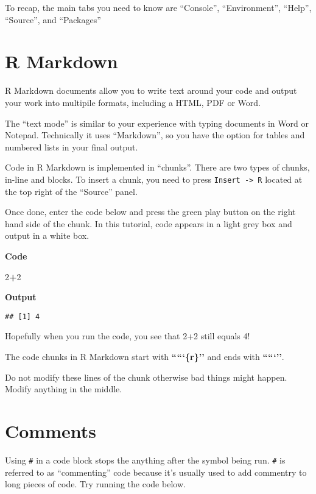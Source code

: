 \documentclass[]{book}
\newenvironment{Shaded}{\begin{snugshade}}{\end{snugshade}}
\newcommand{\DecValTok}[1]{\textcolor[rgb]{0.00,0.00,0.81}{#1}}
\newcommand{\OperatorTok}[1]{\textcolor[rgb]{0.81,0.36,0.00}{\textbf{#1}}}
\begin{document}
To recap, the main tabs you need to know are ``Console'', ``Environment'', ``Help'', ``Source'', and ``Packages''

\hypertarget{r-markdown}{%
\section{R Markdown}\label{r-markdown}}

R Markdown documents allow you to write text around your code and output your work into multipile formats, including a HTML, PDF or Word.

The ``text mode'' is similar to your experience with typing documents in Word or Notepad. Technically it uses ``Markdown'', so you have the option for tables and numbered lists in your final output.

Code in R Markdown is implemented in ``chunks''. There are two types of chunks, in-line and blocks. To insert a chunk, you need to press \texttt{Insert\ -\textgreater{}\ R} located at the top right of the ``Source'' panel.

Once done, enter the code below and press the green play button on the right hand side of the chunk. In this tutorial, code appears in a light grey box and output in a white box.

\textbf{Code}

\begin{Shaded}
\begin{Highlighting}[]
\DecValTok{2}\OperatorTok{+}\DecValTok{2}
\end{Highlighting}
\end{Shaded}

\textbf{Output}

\begin{verbatim}
## [1] 4
\end{verbatim}

Hopefully when you run the code, you see that 2+2 still equals 4!

The code chunks in R Markdown start with \textbf{`````\{r\}''} and ends with \textbf{`````''}.

Do not modify these lines of the chunk otherwise bad things might happen. Modify anything in the middle.

\hypertarget{comments}{%
\section{Comments}\label{comments}}

Using \texttt{\#} in a code block stops the anything after the symbol being run. \texttt{\#} is referred to as ``commenting'' code because it's usually used to add commentry to long pieces of code. Try running the code below.
\end{document}
